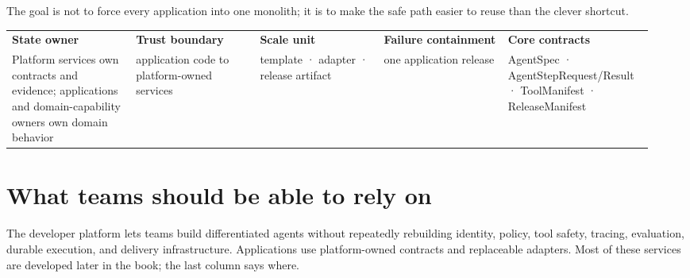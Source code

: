 The goal is not to force every application into one monolith; it is to make the safe path easier to reuse than the clever shortcut.\par

\BookTableStart
\fontsize{7.2}{9}\selectfont
\begin{tabular}{@{}Y{0.1880\linewidth}Y{0.1880\linewidth}Y{0.1880\linewidth}Y{0.1880\linewidth}Y{0.1880\linewidth}@{}}
\color{white}\bfseries \textbf{State owner} & \color{white}\bfseries \textbf{Trust boundary} & \color{white}\bfseries \textbf{Scale unit} & \color{white}\bfseries \textbf{Failure containment} & \color{white}\bfseries \textbf{Core contracts} \\
Platform services own contracts and evidence; applications and domain-capability owners own domain behavior & application code to platform-owned services & template · adapter · release artifact & one application release & AgentSpec · AgentStepRequest/Result · ToolManifest · ReleaseManifest \\
\end{tabular}
\BookTableEnd

\section{What teams should be able to rely on}

The developer platform lets teams build differentiated agents without repeatedly rebuilding identity, policy, tool safety, tracing, evaluation, durable execution, and delivery infrastructure. Applications use platform-owned contracts and replaceable adapters. Most of these services are developed later in the book; the last column says where.\par


